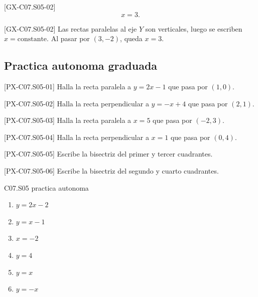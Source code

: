 \begin{shortanswer}{[GX-C07.S05-02]}
\[
x=3.
\]
\end{shortanswer}

\begin{fullsolution}{[GX-C07.S05-02]}
Las rectas paralelas al eje \(Y\) son verticales, luego se escriben \(x=\text{constante}\). Al
pasar por \((3,-2)\), queda \(x=3\).
\end{fullsolution}

\subsection*{Practica autonoma graduada}
\begin{exercise}{[PX-C07.S05-01] Halla la recta paralela a \(y=2x-1\) que pasa por \((1,0)\).}
\end{exercise}
\begin{exercise}{[PX-C07.S05-02] Halla la recta perpendicular a \(y=-x+4\) que pasa por \((2,1)\).}
\end{exercise}
\begin{exercise}{[PX-C07.S05-03] Halla la recta paralela a \(x=5\) que pasa por \((-2,3)\).}
\end{exercise}
\begin{exercise}{[PX-C07.S05-04] Halla la recta perpendicular a \(x=1\) que pasa por \((0,4)\).}
\end{exercise}
\begin{exercise}{[PX-C07.S05-05] Escribe la bisectriz del primer y tercer cuadrantes.}
\end{exercise}
\begin{exercise}{[PX-C07.S05-06] Escribe la bisectriz del segundo y cuarto cuadrantes.}
\end{exercise}

\begin{shortanswer}{C07.S05 practica autonoma}
\begin{enumerate}[label=\textbf{PX-C07.S05-\arabic*:}, leftmargin=*]
  \item \(y=2x-2\)
  \item \(y=x-1\)
  \item \(x=-2\)
  \item \(y=4\)
  \item \(y=x\)
  \item \(y=-x\)
\end{enumerate}
\end{shortanswer}

